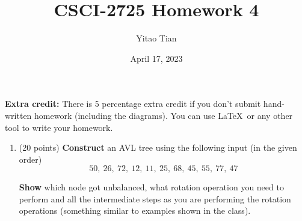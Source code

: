 \documentclass[12pt, a4paper]{article}
\title{CSCI-2725 Homework 4}
\author{Yitao Tian}
\date{April 17, 2023}
\begin{document}
\maketitle

\textbf{Extra credit:} There is 5 percentage extra credit if you don't submit hand-written homework (including the diagrams).
You can use \LaTeX\ or any other tool to write your homework.

\begin{enumerate}

    \item (20 points) \textbf{Construct} an AVL tree using the following input (in the
    given order)
    \begin{equation*}
      50,\ 26,\ 72,\ 12,\ 11,\ 25,\ 68,\ 45,\ 55,\ 77,\ 47
    \end{equation*}

    \textbf{Show} which node got unbalanced, what rotation operation you need
    to perform and all the intermediate steps as you are performing the
    rotation operations (something similar to examples shown in the class).


\end{enumerate}
\end{document}

